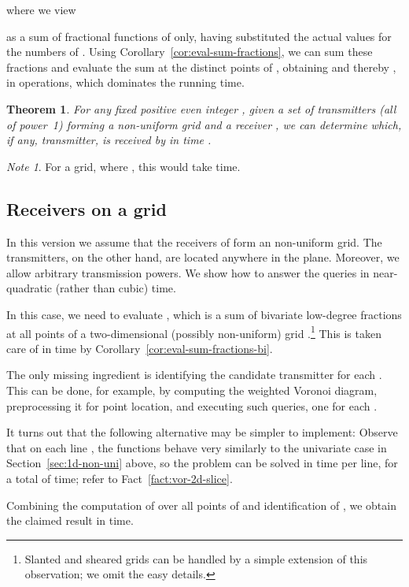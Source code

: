 \documentclass[11pt]{article}
\newtheorem{theorem}{Theorem}[section]
\theoremstyle{remark}
\newtheorem*{note}{Note}
\begin{document}
where we view

as a sum of fractional functions of  only, having substituted the actual
values for the numbers of .  Using
Corollary~\ref{cor:eval-sum-fractions}, we can sum these fractions and
evaluate the sum at the  distinct points  of ,
obtaining  and thereby , in 
 operations, which dominates the running
time.

\begin{theorem}
  \label{th:2d-transmitters-on-grid}
  For any fixed positive even integer , given a set  of 
  transmitters (all of power~1) forming a  non-uniform grid and
	a receiver , we can determine
  which, if any, transmitter, is received by  in
  time .
\end{theorem}

\begin{note}
  For a  grid, where , this would take  time.
\end{note}

\subsection{Receivers on a grid}
\label{sec:rec-grid}
In this version we assume that the receivers of  form an  non-uniform grid.
The  transmitters, on the other hand, are located anywhere in the plane. Moreover, we allow arbitrary transmission powers.
We show how to answer the  queries in near-quadratic (rather than  cubic) time.

In this case, we need to evaluate , which is a sum of 
bivariate low-degree fractions at all points  of a
two-dimensional (possibly non-uniform) grid .\footnote{Slanted and sheared grids can be handled by a simple
  extension of this observation; we omit the easy details.}
This is taken care of in  time by
Corollary~\ref{cor:eval-sum-fractions-bi}.

The only missing ingredient is identifying the candidate transmitter
 for each .  This can be done, for example,
by computing the weighted Voronoi diagram, preprocessing it for point
location, and executing  such queries, one for each .  

It turns out that the following alternative may be 
simpler to implement: Observe that on each line , the
functions  behave very similarly to the
univariate case in Section~\ref{sec:1d-non-uni} above, so the problem
can be solved in  time per line, for a total of  time; refer to Fact~\ref{fact:vor-2d-slice}.


Combining the computation of  over all points of 
and identification of , we obtain the claimed result in
 time.
\end{document}
